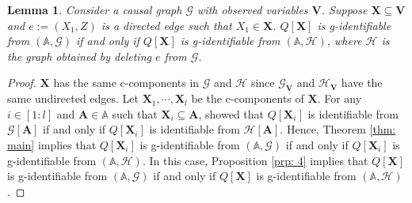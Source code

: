 \documentclass[accepted]{uai2022}
\newtheorem{lemma}{Lemma}
\newcommand{\V}[0]{\mathbf{V}}
\newcommand{\X}[0]{\mathbf{X}}
\newcommand{\A}[0]{\mathbf{A}}
\newcommand{\G}[0]{\mathcal{G}}
\begin{document}
        \begin{lemma} \label{lemma: prp3 - 1}
        Consider a causal graph $\G$ with observed variables $\V$.
            Suppose $\X \subseteq \V$ and $e:=(X_1,Z)$ is a directed edge such that $X_1\in\X$.
            $Q[\X]$ is g-identifiable from $(\mathbb{A},\G)$ if and only if $Q[\X]$ is g-identifiable from $(\mathbb{A}, \mathcal{H})$, where $\mathcal{H}$ is the graph obtained by deleting $e$ from $\G$.
        \end{lemma}
        \begin{proof}
            $\X$ has the same c-components in $\G$ and $\mathcal{H}$ since $\G_{\V}$ and $\mathcal{H}_{\V}$ have the same undirected edges. 
            Let $\X_1,\cdots,\X_l$ be the c-components of $\X$. 
            For any $i\in [1:l]$ and $\A \in \mathbb{A}$ such that $\X_i \subseteq \A$, \cite{huang2008completeness} showed that $Q[\X_i]$ is identifiable from $\G[\A]$ if and only if $Q[\X_i]$ is identifiable from $\mathcal{H}[\A]$. 
            Hence, Theorem \ref{thm: main} implies that $Q[\X_i]$ is g-identifiable from $(\mathbb{A},\G)$ if and only if $Q[\X_i]$ is g-identifiable from $(\mathbb{A},\mathcal{H})$.
            In this case, Proposition \ref{prp: 4} implies that $Q[\X]$ is g-identifiable from $(\mathbb{A},\G)$ if and only if $Q[\X]$ is g-identifiable from $(\mathbb{A},\mathcal{H})$.
        \end{proof}
    
\end{document}

